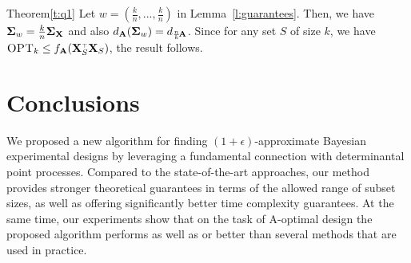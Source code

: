 \documentclass[thesis.tex]{subfiles}
\begin{document}
\begin{proofof}{Theorem}{\ref{t:q1}}
Let $w=(\frac kn,...,\frac kn)$ in Lemma~\ref{l:guarantees}. Then, we have
$\mathbf{\Sigma}_w=\frac kn\mathbf{\Sigma}_{\mathbf X}$ and also $d_{\mathbf A}(\mathbf{\Sigma}_w) =
d_{\frac nk\!\mathbf A}$. Since for any set $S$ of size $k$, we
have $\opt\leq f_{\A}(\X_S^\top\X_S)$, the result follows.
\end{proofof}



\section{Conclusions}

We proposed a new algorithm for finding
$(1+\epsilon)$-approximate Bayesian experimental designs by leveraging 
a fundamental connection with determinantal point processes. Compared
to the state-of-the-art approaches, our
method provides stronger theoretical guarantees in terms of the allowed
range of subset sizes, as well as
offering significantly better time complexity guarantees. At the same
time, our experiments show that on the task of A-optimal design the
proposed algorithm performs as well as or better than several methods that
are used in practice. 




% 
% 

\newpage
\appendix

\onecolumn
\end{document}
